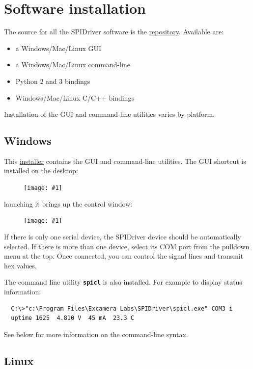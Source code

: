 \documentclass{article}
\newcommand{\png}[1]{
\begin{figure}[H]
\begin{center}
\texttt{[image: \#1]}
\end{center}
\end{figure}
}
\newcommand{\mach}[1]{\texttt{\textbf{#1}}}
\begin{document}
\section{Software installation}

The source for all the SPIDriver software is the
\href{https://github.com/jamesbowman/spidriver}{repository}.
Available are:

\begin{itemize}
\item a Windows/Mac/Linux GUI
\item a Windows/Mac/Linux command-line
\item Python 2 and 3 bindings
\item Windows/Mac/Linux C/C++ bindings
\end{itemize}

Installation of the GUI and command-line utilities varies by platform.

\subsection{Windows}

This
\href{https://github.com/jamesbowman/spidriver/releases/download/v0.1.1/spidriver-installer.exe}{installer}
contains the GUI and command-line utilities.
The GUI shortcut is installed on the desktop:

\png{img/spidriver/icon}

launching it brings up the control window:

\png{img/spidriver/gui}

If there is only one serial device, 
the SPIDriver device should be automatically selected.
If there is more than one device, select its COM port from the pulldown menu at the top.
Once connected, you can control the signal lines and transmit hex values.

The command line utility \mach{spicl} is also installed. For example to display status information:

\begin{lstlisting}
  C:\>"c:\Program Files\Excamera Labs\SPIDriver\spicl.exe" COM3 i
  uptime 1625  4.810 V  45 mA  23.3 C
\end{lstlisting}

See below for more information on the command-line syntax.

\subsection{Linux}
\end{document}
